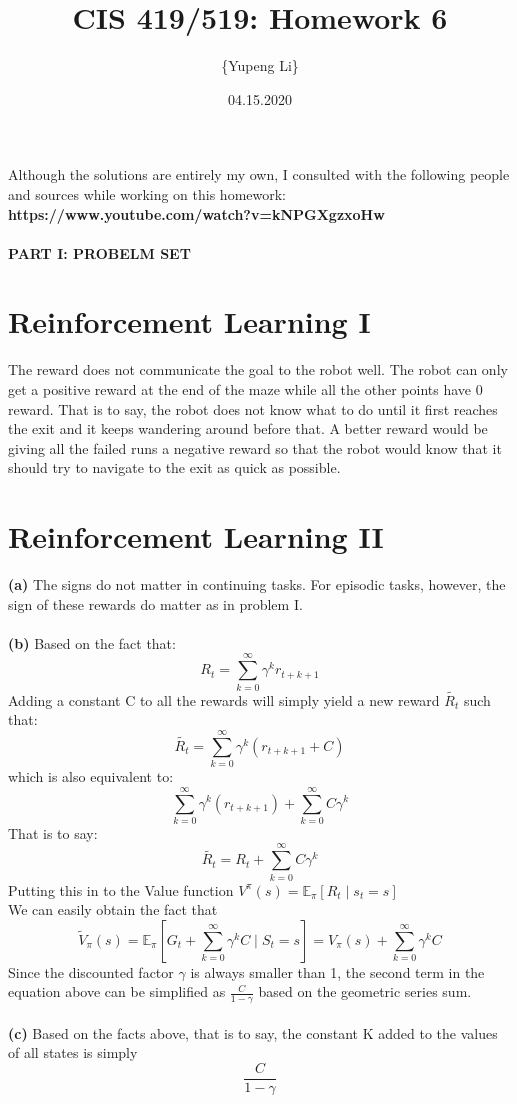 \documentclass{article}
\title{CIS 419/519: Homework 6}
\author{\{Yupeng Li\}}
\date{04.15.2020}
\begin{document}
    \maketitle
    Although the solutions are entirely my own, I consulted with the following people and sources while working on this homework: \textbf{https://www.youtube.com/watch?v=kNPGXgzxoHw}
    \paragraph{PART I: PROBELM SET}
    \section{Reinforcement Learning I}
    The reward does not communicate the goal to the robot well. The robot can only get a positive reward at the end of the maze while all the other points have 0 reward. That is to say, the robot does not know what to do until it first reaches the exit and it keeps wandering around before that. A better reward would be giving all the failed runs a negative reward so that the robot would know that it should try to navigate to the exit as quick as possible.
    \section{Reinforcement Learning II}
\textbf{(a)} The signs do not matter in continuing tasks. For episodic tasks, however, the sign of these rewards do matter as in problem I.\\\\
\textbf{(b)} Based on the fact that:
\[R_{t} = \sum_{k=0}^{\infty} \gamma^{k} r_{t+k+1}\]
Adding a constant C to all the rewards will simply yield a new reward $\tilde{R_{t}}$ such that:
\[\tilde{R_{t}} = \sum_{k=0}^{\infty} \gamma^{k} (r_{t+k+1} + C)\]
which is also equivalent to:
\[\sum_{k=0}^{\infty} \gamma^{k} (r_{t+k+1}) + \sum_{k=0}^{\infty} C \gamma^k\]
That is to say:
\[\tilde{R_{t}} = R_{t} + \sum_{k=0}^{\infty} C \gamma^k \]
Putting this in to the Value function $V^{\pi}(s) = \mathbb{E}_{\pi} [R_{t}\mid s_t =s]$\\
We can easily obtain the fact that 
\[\tilde{V}_{\pi}(s) = \mathbb{E}_{\pi} [G_{t} + \sum_{k=0}^{\infty} \gamma^k C \mid S_t = s] = V_{\pi} (s) + \sum_{k=0}^{\infty} \gamma^k C\]
Since the discounted factor $\gamma$ is always smaller than 1, the second term in the equation above can be simplified as $\frac{C}{1-\gamma}$ based on the geometric series sum.\\\\
\textbf{(c)} Based on the facts above, that is to say, the constant K added to the values of all states is simply 
\[\frac{C}{1-\gamma}\]
\end{document}
